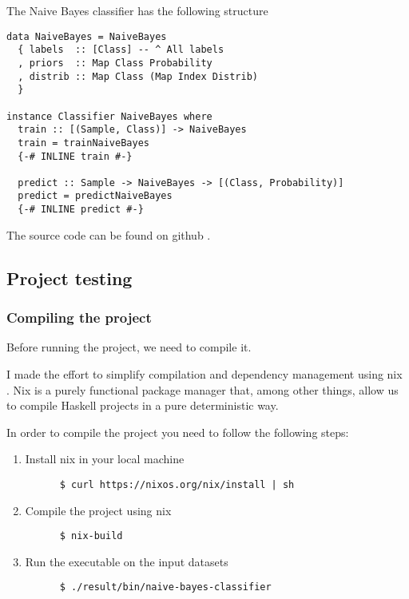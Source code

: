 \documentclass[12pt, a4paper]{article}
\begin{document}
The Naive Bayes classifier has the following structure

\begin{verbatim}
data NaiveBayes = NaiveBayes
  { labels  :: [Class] -- ^ All labels
  , priors  :: Map Class Probability
  , distrib :: Map Class (Map Index Distrib)
  }

instance Classifier NaiveBayes where
  train :: [(Sample, Class)] -> NaiveBayes
  train = trainNaiveBayes
  {-# INLINE train #-}

  predict :: Sample -> NaiveBayes -> [(Class, Probability)]
  predict = predictNaiveBayes
  {-# INLINE predict #-}
\end{verbatim}

The source code can be found on github \cite{naive-bayes-classifier}.

\subsection{Project testing} \label{project-testing}

\subsubsection{Compiling the project} \label{compiling}

Before running the project, we need to compile it.

I made the effort to simplify compilation and dependency management using nix \cite{nix}.
Nix is a purely functional package manager that, among other things, allow us to compile Haskell projects in a pure deterministic way.

In order to compile the project you need to follow the following steps:

\begin{enumerate}
  \item Install nix in your local machine
    \begin{verbatim}
      $ curl https://nixos.org/nix/install | sh
    \end{verbatim}
  \item Compile the project using nix
    \begin{verbatim}
      $ nix-build
    \end{verbatim}
  \item Run the executable on the input datasets
    \begin{verbatim}
      $ ./result/bin/naive-bayes-classifier
    \end{verbatim}
\end{enumerate}
\end{document}
